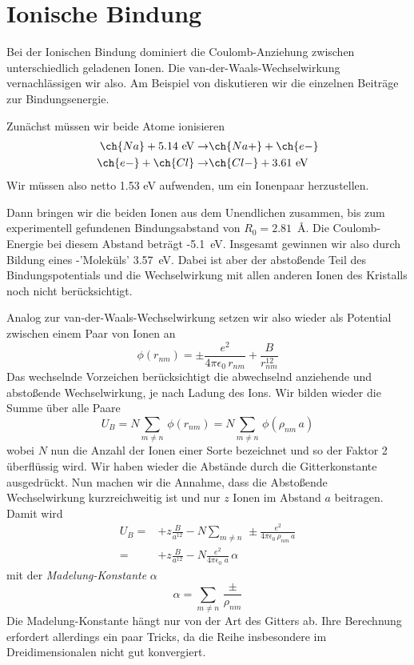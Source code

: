 \section{Ionische Bindung}

Bei der Ionischen Bindung dominiert die Coulomb-Anziehung zwischen unterschiedlich geladenen Ionen. Die van-der-Waals-Wechselwirkung vernachlässigen wir also. Am Beispiel von  diskutieren wir die einzelnen Beiträge zur Bindungsenergie.

Zunächst müssen wir beide Atome ionisieren
\begin{align}
 \ch{Na} + 5.14\text{ eV} \rightarrow  & \ch{Na+} + \ch{e-} \\
  \ch{e-}  + \ch{Cl} \rightarrow  & \ch{Cl-} + 3.61\text{ eV}
\end{align}
Wir müssen also netto 1.53 eV aufwenden, um ein Ionenpaar herzustellen.

Dann bringen wir die beiden Ionen aus dem Unendlichen zusammen, bis zum experimentell gefundenen Bindungsabstand von $R_0 = 2.81$~\AA. Die Coulomb-Energie bei diesem Abstand beträgt -5.1~eV. Insgesamt gewinnen wir also durch Bildung eines -'Moleküls' 3.57~eV. Dabei ist aber der abstoßende Teil des Bindungspotentials und die Wechselwirkung mit allen anderen Ionen des Kristalls noch nicht berücksichtigt.

Analog zur van-der-Waals-Wechselwirkung setzen wir also wieder als Potential zwischen einem Paar von Ionen an
\begin{equation}
 \phi(r_{nm}) = \pm \frac{e^2}{4 \pi \epsilon_0 \, r_{nm}} + \frac{B}{ r_{nm}^{12}}
\end{equation}
Das wechselnde Vorzeichen berücksichtigt die abwechselnd anziehende und abstoßende Wechselwirkung, je nach Ladung des Ions. Wir bilden wieder die Summe über alle Paare
\begin{equation}
U_B = N \sum_{m \neq n} \, \phi(r_{nm})  = N \sum_{m \neq n} \, \phi(\rho_{nm} \, a) 
\end{equation}
wobei $N$ nun die Anzahl der Ionen einer Sorte bezeichnet und so der Faktor 2 überflüssig wird. Wir haben wieder die Abstände durch die Gitterkonstante ausgedrückt. Nun machen wir die Annahme, dass die Abstoßende Wechselwirkung kurzreichweitig ist und nur $z$ Ionen im Abstand $a$ beitragen. Damit wird  
\begin{align}
U_B = & + z \frac{ B}{ a^{12}} - N \sum_{m \neq n} \, \pm \frac{e^2}{4 \pi \epsilon_0 \, \rho_{nm} \, a}  \\
= & + z \frac{ B}{ a^{12}} - N \frac{e^2}{4 \pi \epsilon_0 \,  \, a}  \, \alpha
\end{align}
mit der \emph{Madelung-Konstante} $\alpha$
\begin{equation}
 \alpha = \sum_{m \neq n} \, \frac{\pm}{\rho_{nm} }  
\end{equation}
Die Madelung-Konstante hängt nur von der Art des Gitters ab. Ihre Berechnung erfordert allerdings ein paar Tricks, da die Reihe insbesondere im Dreidimensionalen nicht gut konvergiert. 

